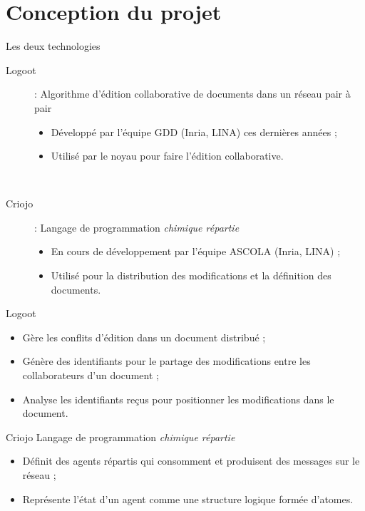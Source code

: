 \section{Conception du projet}
\begin{frame}{Les deux technologies}
\begin{description}
\item [Logoot] : Algorithme d'édition collaborative de documents dans un réseau
    pair à pair
  \begin{itemize}
    \item Développé par l'équipe GDD (Inria, LINA) ces dernières années ;
    \item Utilisé par le noyau pour faire l'édition collaborative.
  \end{itemize} ~
\item [Criojo] : Langage de programmation \emph{chimique répartie}
  \begin{itemize}
    \item En cours de développement par l'équipe ASCOLA (Inria, LINA) ;
    \item Utilisé pour la distribution des modifications et la définition
    des documents.
  \end{itemize}
\end{description}
\end{frame}

\begin{frame}{Logoot}
\begin{itemize}
  \item Gère les conflits d'édition dans un document distribué ;
  \item Génère des identifiants pour le partage des modifications entre les
  collaborateurs d'un document ;
  \item Analyse les identifiants reçus pour positionner les modifications dans
  le document.
\end{itemize}
\end{frame}

\begin{frame}{Criojo}
Langage de programmation \emph{chimique répartie}
\begin{itemize}
  \item Définit des agents répartis qui consomment et produisent des messages
  sur le réseau ;
  \item Représente l'état d'un agent comme une structure logique formée
  d'atomes.
\end{itemize}
\end{frame}

